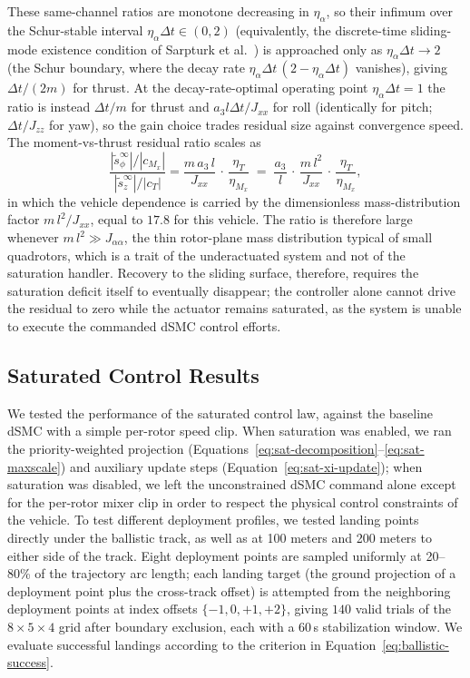 \documentclass[conf]{new-aiaa}
\begin{document}
These same-channel ratios are monotone decreasing in $\eta_\alpha$, so their infimum over the Schur-stable interval $\eta_\alpha \Delta t \in (0,2)$ (equivalently, the discrete-time sliding-mode existence condition of Sarpturk et al.\ \cite{refs:Sarpturk1987}) is approached only as $\eta_\alpha \Delta t \to 2$ (the Schur boundary, where the decay rate $\eta_\alpha \Delta t\,(2 - \eta_\alpha \Delta t)$ vanishes), giving $\Delta t/(2m)$ for thrust. At the decay-rate-optimal operating point $\eta_\alpha \Delta t = 1$ the ratio is instead $\Delta t/m$ for thrust and $a_3 l \Delta t/J_{xx}$ for roll (identically for pitch; $\Delta t/J_{zz}$ for yaw), so the gain choice trades residual size against convergence speed. The moment-vs-thrust residual ratio scales as
\begin{equation}
\label{eq:sat-residual-ratio}
\frac{|\tilde s_\phi^\infty|/|c_{M_x}|}{|\tilde s_z^\infty|/|c_T|} = \frac{m\, a_3\, l}{J_{xx}}\, \cdot\, \frac{\eta_T}{\eta_{M_x}}
\;=\; \frac{a_3}{l}\, \cdot\, \frac{m\, l^2}{J_{xx}}\, \cdot\, \frac{\eta_T}{\eta_{M_x}},
\end{equation}
in which the vehicle dependence is carried by the dimensionless mass-distribution factor $m\, l^2 / J_{xx}$, equal to $17.8$ for this vehicle. The ratio is therefore large whenever $m\, l^2 \gg J_{\alpha\alpha}$, the thin rotor-plane mass distribution typical of small quadrotors, which is a trait of the underactuated system and not of the saturation handler. Recovery to the sliding surface, therefore, requires the saturation deficit itself to eventually disappear; the controller alone cannot drive the residual to zero while the actuator remains saturated, as the system is unable to execute the commanded dSMC control efforts.

\subsection{Saturated Control Results}
\label{sec:sat-validation}

We tested the performance of the saturated control law, against the baseline dSMC with a simple per-rotor speed clip. When saturation was enabled, we ran the priority-weighted projection (Equations~\ref{eq:sat-decomposition}–\ref{eq:sat-maxscale}) and auxiliary update steps (Equation~\ref{eq:sat-xi-update}); when saturation was disabled, we left the unconstrained dSMC command alone except for the per-rotor mixer clip in order to respect the physical control constraints of the vehicle. To test different deployment profiles, we tested landing points directly under the ballistic track, as well as at 100 meters and 200 meters to either side of the track. Eight deployment points are sampled uniformly at 20--80\% of the trajectory arc length; each landing target (the ground projection of a deployment point plus the cross-track offset) is attempted from the neighboring deployment points at index offsets $\{-1, 0, +1, +2\}$, giving $140$ valid trials of the $8 \times 5 \times 4$ grid after boundary exclusion, each with a $60$\,s stabilization window. We evaluate successful landings according to the criterion in Equation~\ref{eq:ballistic-success}.
\end{document}
